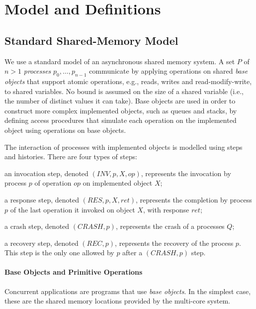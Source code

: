 
\section{Model and Definitions}
\label{section: Model}

\subsection{Standard Shared-Memory Model}

We use a standard model of an asynchronous shared memory system. A set $P$ of $n > 1$ \textit{processes} $p_0, \ldots, p_{n-1}$ communicate by applying operations on shared \textit{base objects} that support atomic operations, e.g., reads, writes and read-modify-write, to shared variables. No bound is assumed on the size of a shared variable (i.e., the number of distinct values it can take).
Base objects are used in order to construct more complex implemented objects, such as queues and stacks, by defining access procedures that simulate each operation on the implemented object using operations on base objects.

The interaction of processes with implemented objects is modelled using steps and histories. There are four types of steps:
\begin{inparaenum}[(1)]
	\item an invocation step, denoted $(INV, p, X, op)$, represents the invocation by process $p$ of operation $op$ on implemented object $X$;
	\item a response step, denoted $(RES, p, X, ret)$, represents the completion by process $p$ of the last operation it invoked on object $X$, with response $ret$;
	\item a crash step, denoted $(CRASH, p)$, represents the crash of a processes $Q$;
	\item a recovery step, denoted $(REC, p)$, represents the recovery of the process $p$. This step is the only one allowed by $p$ after a $(CRASH, p)$ step.
\end{inparaenum}



\paragraph{Base Objects and Primitive Operations}
Concurrent applications are programs that use \emph{base objects}.
In the simplest case, these are the shared memory locations provided by the multi-core system.

